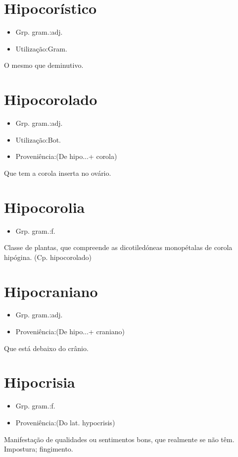 \documentclass{article}
\begin{document}
\section{Hipocorístico}
\begin{itemize}
\item {Grp. gram.:adj.}
\end{itemize}
\begin{itemize}
\item {Utilização:Gram.}
\end{itemize}
O mesmo que \textunderscore deminutivo\textunderscore .
\section{Hipocorolado}
\begin{itemize}
\item {Grp. gram.:adj.}
\end{itemize}
\begin{itemize}
\item {Utilização:Bot.}
\end{itemize}
\begin{itemize}
\item {Proveniência:(De \textunderscore hipo...\textunderscore  + \textunderscore corola\textunderscore )}
\end{itemize}
Que tem a corola inserta no ovário.
\section{Hipocorolia}
\begin{itemize}
\item {Grp. gram.:f.}
\end{itemize}
Classe de plantas, que compreende as dicotiledóneas monopétalas de corola hipógina.
(Cp. \textunderscore hipocorolado\textunderscore )
\section{Hipocraniano}
\begin{itemize}
\item {Grp. gram.:adj.}
\end{itemize}
\begin{itemize}
\item {Proveniência:(De \textunderscore hipo...\textunderscore  + \textunderscore craniano\textunderscore )}
\end{itemize}
Que está debaixo do crânio.
\section{Hipocrisia}
\begin{itemize}
\item {Grp. gram.:f.}
\end{itemize}
\begin{itemize}
\item {Proveniência:(Do lat. \textunderscore hypocrisis\textunderscore )}
\end{itemize}
Manifestação de qualidades ou sentimentos bons, que realmente se não têm.
Impostura; fingimento.
\end{document}
